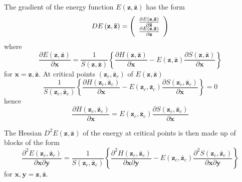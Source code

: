\documentclass[aps,preprint]{revtex4}%
\begin{document}
The gradient of the energy function $E\left(  \mathbf{z},\mathbf{\bar{z}%
}\right)  $ has the form%
\begin{equation}
DE\left(  \mathbf{z},\mathbf{\bar{z}}\right)  =\left(
\begin{array}
[c]{c}%
\frac{\partial E\left(  \mathbf{z},\mathbf{\bar{z}}\right)  }{\partial
\mathbf{\bar{z}}}\\
\frac{\partial E\left(  \mathbf{z},\mathbf{\bar{z}}\right)  }{\partial
\mathbf{z}}%
\end{array}
\right)
\end{equation}
where
\begin{equation}
\frac{\partial E\left(  \mathbf{z},\mathbf{\bar{z}}\right)  }{\partial
\mathbf{x}}=\frac{1}{S\left(  \mathbf{z},\mathbf{\bar{z}}\right)  }\left\{
\frac{\partial H\left(  \mathbf{z},\mathbf{\bar{z}}\right)  }{\partial
\mathbf{x}}-E\left(  \mathbf{z},\mathbf{\bar{z}}\right)  \frac{\partial
S\left(  \mathbf{z},\mathbf{\bar{z}}\right)  }{\partial\mathbf{x}}\right\}
\end{equation}
for $\mathbf{x=z,\bar{z}}$. At critical points $\left(  \mathbf{z}%
_{c},\mathbf{\bar{z}}_{c}\right)  $ of $E\left(  \mathbf{z},\mathbf{\bar{z}%
}\right)  $
\begin{equation}
\frac{1}{S\left(  \mathbf{z}_{c},\mathbf{\bar{z}}_{c}\right)  }\left\{
\frac{\partial H\left(  \mathbf{z}_{c},\mathbf{\bar{z}}_{c}\right)  }%
{\partial\mathbf{x}}-E\left(  \mathbf{z}_{c},\mathbf{\bar{z}}_{c}\right)
\frac{\partial S\left(  \mathbf{z}_{c},\mathbf{\bar{z}}_{c}\right)  }%
{\partial\mathbf{x}}\right\}  =0
\end{equation}
hence
\begin{equation}
\frac{\partial H\left(  \mathbf{z}_{c},\mathbf{\bar{z}}_{c}\right)  }%
{\partial\mathbf{x}}=E\left(  \mathbf{z}_{c},\mathbf{\bar{z}}_{c}\right)
\frac{\partial S\left(  \mathbf{z}_{c},\mathbf{\bar{z}}_{c}\right)  }%
{\partial\mathbf{x}}%
\end{equation}


The Hessian $D^{2}E\left(  \mathbf{z},\mathbf{\bar{z}}\right)  $ of the energy
at critical points is then made up of blocks of the form
\begin{equation}
\frac{\partial^{2}E\left(  \mathbf{z}_{c},\mathbf{\bar{z}}_{c}\right)
}{\partial\mathbf{x}\partial\mathbf{y}}=\frac{1}{S\left(  \mathbf{z}%
_{c},\mathbf{\bar{z}}_{c}\right)  }\left\{  \frac{\partial^{2}H\left(
\mathbf{z}_{c},\mathbf{\bar{z}}_{c}\right)  }{\partial\mathbf{x}%
\partial\mathbf{y}}-E\left(  \mathbf{z}_{c},\mathbf{\bar{z}}_{c}\right)
\frac{\partial^{2}S\left(  \mathbf{z}_{c},\mathbf{\bar{z}}_{c}\right)
}{\partial\mathbf{x}\partial\mathbf{y}}\right\}
\end{equation}
for $\mathbf{x},\mathbf{y=z},\mathbf{\bar{z}}$.
\end{document}
